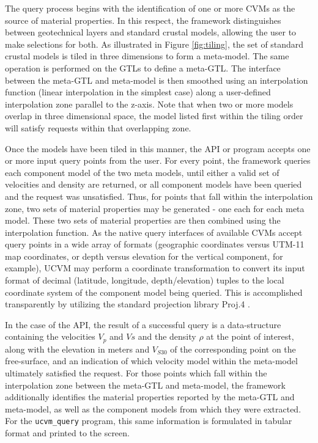 The query process begins with the identification of one or more CVMs as the source of material properties. In this respect, the framework distinguishes between geotechnical layers and standard crustal models, allowing the user to make selections for both. As illustrated in Figure \ref{fig:tiling}, the set of standard crustal models is tiled in three dimensions to form a meta-model. The same operation is performed on the GTLs to define a meta-GTL. The interface between the meta-GTL and meta-model is then smoothed using an interpolation function (linear interpolation in the simplest case) along a user-defined interpolation zone parallel to the z-axis. Note that when two or more models overlap in three dimensional space, the model listed first within the tiling order will satisfy requests within that overlapping zone.

Once the models have been tiled in this manner, the API or program accepts one or more input query points from the user. For every point, the framework queries each component model of the two meta models, until either a valid set of velocities and density are returned, or all component models have been queried and the request was unsatisfied. Thus, for points that fall within the interpolation zone, two sets of material properties may be generated - one each for each meta model. These two sets of material properties are then combined using the interpolation function. As the native query interfaces of available CVMs accept query points in a wide array of formats (geographic coordinates versus UTM-11 map coordinates, or depth versus elevation for the vertical component, for example), UCVM may perform a coordinate transformation to convert its input format of decimal (latitude, longitude, depth/elevation) tuples to the local coordinate system of the component model being queried. This is accomplished transparently by utilizing the standard projection library Proj.4 \citep{Evenden_2003_Manual}.

In the case of the API, the result of a successful query is a data-structure containing the velocities $V_{p}$ and $V{s}$ and the density $\rho$ at the point of interest, along with the elevation in meters and $V_{S30}$ of the corresponding point on the free-surface, and an indication of which velocity model within the meta-model ultimately satisfied the request. For those points which fall within the interpolation zone between the meta-GTL and meta-model, the framework additionally identifies the material properties reported by the meta-GTL and meta-model, as well as the component models from which they were extracted. For the \texttt{ucvm\_query} program, this same information is formulated in tabular format and printed to the screen.

